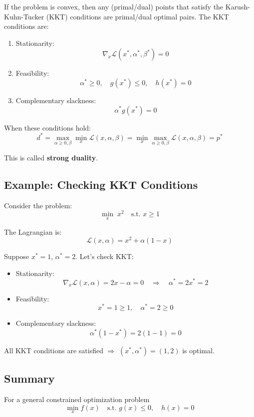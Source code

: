 \documentclass[11pt]{article}
\begin{document}
If the problem is convex, then any (primal/dual) points that satisfy the
Karush-Kuhn-Tucker (KKT) conditions are primal/dual optimal pairs. The KKT conditions are:

\begin{enumerate}
    \item Stationarity: 
    \[
    \nabla_x \mathcal{L}(x^*, \alpha^*, \beta^*) = 0
    \]
    \item Feasibility:
    \[
    \alpha^* \geq 0, \quad g(x^*) \leq 0, \quad h(x^*) = 0
    \]
    \item Complementary slackness:
    \[
    \alpha^* g(x^*) = 0
    \]
\end{enumerate}

When these conditions hold:
\[
d^* = \max_{\alpha \geq 0, \beta} \min_x \mathcal{L}(x, \alpha, \beta) 
= \min_x \max_{\alpha \geq 0, \beta} \mathcal{L}(x, \alpha, \beta) = p^*
\]

This is called \textbf{strong duality}.


\subsection*{Example: Checking KKT Conditions}

Consider the problem:
\[
\min_x \; x^2 \quad \text{s.t. } x \geq 1
\]

The Lagrangian is:
\[
\mathcal{L}(x, \alpha) = x^2 + \alpha (1 - x)
\]

Suppose $x^* = 1$, $\alpha^* = 2$. Let’s check KKT:

\begin{itemize}
    \item Stationarity: 
    \[
    \nabla_x \mathcal{L}(x, \alpha) = 2x - \alpha = 0 
    \quad \Rightarrow \quad \alpha^* = 2x^* = 2
    \]
    \item Feasibility: 
    \[
    x^* = 1 \geq 1, \quad \alpha^* = 2 \geq 0
    \]
    \item Complementary slackness: 
    \[
    \alpha^* (1 - x^*) = 2(1 - 1) = 0
    \]
\end{itemize}

All KKT conditions are satisfied $\Rightarrow$ $(x^*, \alpha^*) = (1,2)$ is optimal.

\subsection	*{Summary}

For a general constrained optimization problem
\[
\min_{x} f(x) \quad \text{s.t. } g(x) \leq 0, \quad h(x) = 0
\]
\end{document}
